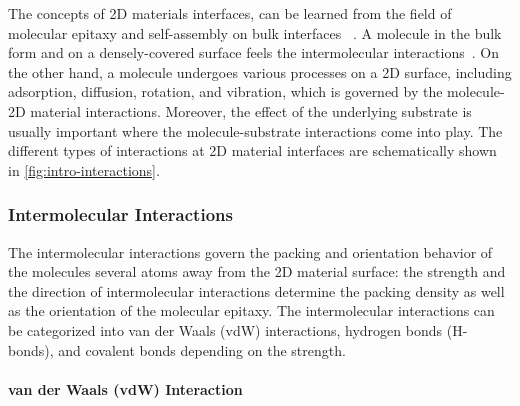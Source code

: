 The concepts of 2D materials interfaces, can be
learned from the field of molecular epitaxy and self-assembly on bulk
interfaces
~\autocite{Kowarik_2008_rev_MBE,Barth_2007,Whitesides_2002_assem_rev,Philips_2D_assem_book}.
% 
A molecule in the bulk form and on a densely-covered surface feels the
intermolecular interactions~\autocite{Israelachvili_2011_book}.
%
On the other hand, a molecule undergoes various
processes on a 2D surface, including adsorption, diffusion, rotation,
and vibration, which is governed by the molecule-2D material
interactions.
%
Moreover, the effect of the underlying substrate is
usually important where the molecule-substrate interactions come into
play.
%
The different types of interactions at 2D material interfaces are
schematically shown in \autoref{fig:intro-interactions}.

\subsubsection{Intermolecular Interactions}
\label{sec:intro-inter-mole}

The intermolecular interactions govern the packing and orientation
behavior of the molecules several atoms away from the 2D material
surface: the strength and the direction of intermolecular interactions
determine the packing density as well as the orientation of the
molecular epitaxy. The intermolecular interactions can be categorized 
into van der Waals (vdW) interactions, hydrogen bonds (H-bonds), and
covalent bonds depending on the strength. 

\paragraph{van der Waals (vdW) Interaction}

